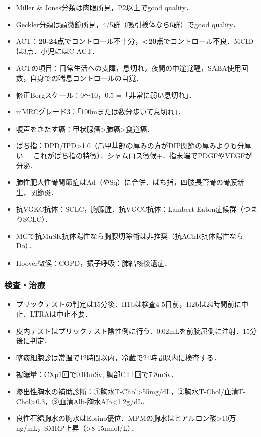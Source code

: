 \begin{itemize}
\item Miller \& Jones分類は肉眼所見，P2以上でgood quality．
\item Geckler分類は顕微鏡所見，4/5群（吸引検体なら6群）でgood quality．
\item ACT：\textbf{20-24点}でコントロール不十分，\textbf{<20点}でコントロール不良．MCIDは3点．小児にはC-ACT．
\item ACTの項目：日常生活への支障，息切れ，夜間の中途覚醒，SABA使用回数，自身での喘息コントロールの自覚．
\item 修正Borgスケール：0〜10，0.5 =「非常に弱い息切れ」．
\item mMRCグレード3：「100mまたは数分歩いて息切れ」．


\item 嗄声をきたす癌：甲状腺癌>肺癌>食道癌．
\item ばち指：DPD/IPD>1.0（爪甲基部の厚みの方がDIP関節の厚みよりも分厚い = これがばち指の特徴）．シャムロス徴候+．指末端でPDGFやVEGFが分泌．
\item 肺性肥大性骨関節症はAd（やSq）に合併．ばち指，四肢長管骨の骨膜新生，関節炎．
\item 抗VGKC抗体：SCLC，胸腺腫．抗VGCC抗体：Lambert-Eaton症候群（つまりSCLC）．
\item MGで抗MuSK抗体陽性なら胸腺切除術は非推奨（抗AChR抗体陽性ならDo）．
\item Hoover徴候：COPD，振子呼吸：肺結核後遺症．
\end{itemize}


\subsubsection{検査・治療}

\begin{itemize}
\item プリックテストの判定は15分後．H1bは検査4-5日前，H2bは24時間前に中止．LTRAは中止不要．
\item 皮内テストはプリックテスト陰性例に行う．0.02mLを前腕屈側に注射．15分後に判定．
\item 喀痰細胞診は常温で12時間以内，冷蔵で24時間以内に検査する．
\item 被曝量：CXp1回で0.04mSv, 胸部CT1回で7.8mSv．
\item 滲出性胸水の補助診断：①胸水T-Chol>55mg/dL，②胸水T-Chol/血清T-Chol>0.3，③血清Alb-胸水Alb<1.2g/dL．
\item 良性石綿胸水の胸水はEosino優位．MPMの胸水はヒアルロン酸>10万ng/mL，SMRP上昇（>8-15nmol/L）．
\end{itemize}


